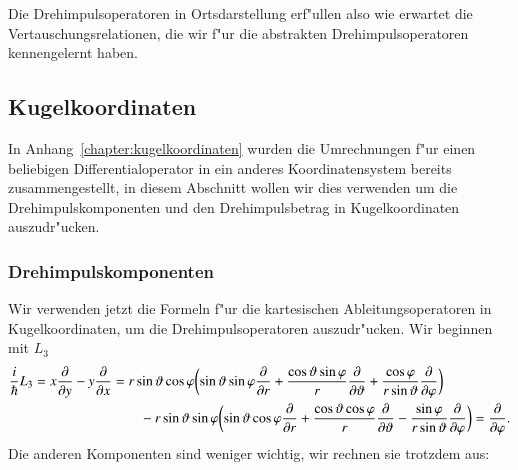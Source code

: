 Die Drehimpulsoperatoren in Ortsdarstellung erf"ullen also wie erwartet
die Vertauschungsrelationen, die wir f"ur die abstrakten Drehimpulsoperatoren
kennengelernt haben.

\subsection{Kugelkoordinaten}
In Anhang~\ref{chapter:kugelkoordinaten} wurden die Umrechnungen f"ur
einen beliebigen Differentialoperator in ein anderes Koordinatensystem
bereits zusammengestellt, in diesem Abschnitt wollen wir dies verwenden
um die Drehimpulskomponenten und den Drehimpulsbetrag in Kugelkoordinaten
auszudr"ucken.
\subsubsection{Drehimpulskomponenten}
Wir verwenden jetzt die Formeln f"ur die kartesischen Ableitungsoperatoren
in Kugelkoordinaten, um die Drehimpulsoperatoren auszudr"ucken.
Wir beginnen mit $L_3$
\begin{align}
\frac{i}{\hbar}
L_3
=
x\frac{\partial}{\partial y}
-
y\frac{\partial}{\partial x}
&=
r\sin\vartheta\cos\varphi
\biggl(
\sin\vartheta\sin\varphi
\frac{\partial}{\partial r}
+
\frac{\cos\vartheta\sin\varphi}{r}
\frac{\partial}{\partial\vartheta}
+
\frac{\cos\varphi}{r\sin\vartheta}
\frac{\partial}{\partial\varphi}
\biggr)
\notag
\\
&\qquad
-
r\sin\vartheta\sin\varphi
\biggl(
\sin\vartheta\cos\varphi
\frac{\partial}{\partial r}
+
\frac{\cos\vartheta\cos\varphi}{r}
\frac{\partial}{\partial\vartheta}
-
\frac{\sin\varphi}{r\sin\vartheta}
\frac{\partial}{\partial\varphi}
\biggr)
=
\frac{\partial}{\partial\varphi}.
\label{skript:l3spherical}
\end{align}
Die anderen Komponenten sind weniger wichtig, wir rechnen sie trotzdem
aus:
